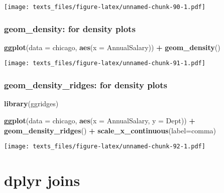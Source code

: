 \documentclass[]{book}
\newenvironment{Shaded}{\begin{snugshade}}{\end{snugshade}}
\newcommand{\DataTypeTok}[1]{\textcolor[rgb]{0.13,0.29,0.53}{#1}}
\newcommand{\KeywordTok}[1]{\textcolor[rgb]{0.13,0.29,0.53}{\textbf{#1}}}
\newcommand{\NormalTok}[1]{#1}
\newcommand{\OperatorTok}[1]{\textcolor[rgb]{0.81,0.36,0.00}{\textbf{#1}}}
\newcommand{\StringTok}[1]{\textcolor[rgb]{0.31,0.60,0.02}{#1}}
\begin{document}
\texttt{[image: texts\_files/figure-latex/unnamed-chunk-90-1.pdf]}

\hypertarget{geomdensity}{%
\subsection*{\texorpdfstring{\textbf{geom\_density}: for density plots}{geom\_density: for density plots}}\label{geomdensity}}

\begin{Shaded}
\begin{Highlighting}[]
\KeywordTok{ggplot}\NormalTok{(}\DataTypeTok{data =}\NormalTok{ chicago, }\KeywordTok{aes}\NormalTok{(}\DataTypeTok{x =}\NormalTok{ AnnualSalary)) }\OperatorTok{+}\StringTok{ }\KeywordTok{geom_density}\NormalTok{() }
\end{Highlighting}
\end{Shaded}

\texttt{[image: texts\_files/figure-latex/unnamed-chunk-91-1.pdf]}

\hypertarget{geomdensityridges}{%
\subsection*{\texorpdfstring{\textbf{geom\_density\_ridges}: for density plots}{geom\_density\_ridges: for density plots}}\label{geomdensityridges}}

\begin{Shaded}
\begin{Highlighting}[]
\KeywordTok{library}\NormalTok{(ggridges)}

\KeywordTok{ggplot}\NormalTok{(}\DataTypeTok{data =}\NormalTok{ chicago, }\KeywordTok{aes}\NormalTok{(}\DataTypeTok{x =}\NormalTok{ AnnualSalary, }\DataTypeTok{y =}\NormalTok{ Dept)) }\OperatorTok{+}\StringTok{ }
\StringTok{  }\KeywordTok{geom_density_ridges}\NormalTok{() }\OperatorTok{+}\StringTok{ }
\StringTok{  }\KeywordTok{scale_x_continuous}\NormalTok{(}\DataTypeTok{label=}\NormalTok{comma)}
\end{Highlighting}
\end{Shaded}

\texttt{[image: texts\_files/figure-latex/unnamed-chunk-92-1.pdf]}

\hypertarget{dplyr-joins}{%
\chapter{dplyr joins}\label{dplyr-joins}}
\end{document}
